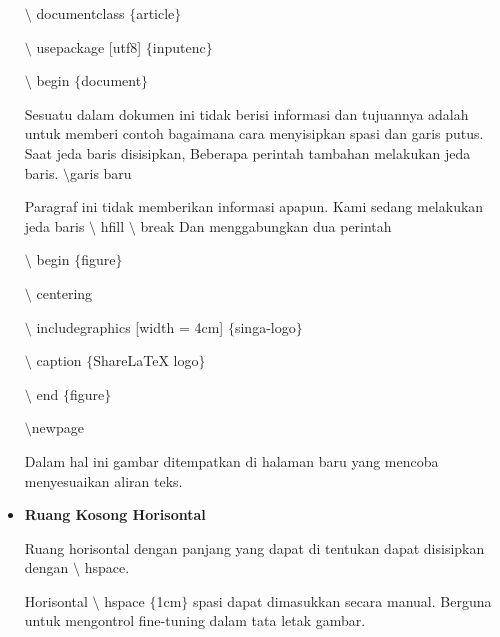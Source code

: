 \begin{itemize}
\hspace*{0.5in}$\setminus$ documentclass $ \{ $article$ \} $\par

\hspace*{0.5in}$\setminus$ usepackage [utf8] $ \{ $inputenc$ \} $ \par

\hspace*{0.5in}$\setminus$ begin $ \{ $document$ \} $\par
\vspace{\baselineskip}
Sesuatu dalam dokumen ini tidak berisi informasi dan tujuannya adalah untuk memberi contoh bagaimana cara menyisipkan spasi dan garis putus. Saat jeda baris disisipkan, Beberapa perintah tambahan melakukan jeda baris. $\setminus$garis baru\par
\vspace{\baselineskip}
Paragraf ini tidak memberikan informasi apapun. Kami sedang melakukan jeda baris $\setminus$ hfill $\setminus$ break Dan menggabungkan dua perintah\par
\vspace{\baselineskip}
\hspace*{0.5in}$\setminus$ begin $ \{ $figure$ \} $\par
\vspace{\baselineskip}
\hspace*{0.5in}$\setminus$ centering\par
\vspace{\baselineskip}
\hspace*{0.5in}$\setminus$ includegraphics [width = 4cm] $ \{ $singa-logo$ \} $\par
\vspace{\baselineskip}
\hspace*{0.5in}$\setminus$ caption $ \{ $ShareLaTeX logo$ \} $\par
\vspace{\baselineskip}
\hspace*{0.5in}$\setminus$ end $ \{ $figure$ \} $ \par
\vspace{\baselineskip}
\hspace*{0.5in}$\setminus$newpage\par
\vspace{\baselineskip}
Dalam hal ini gambar ditempatkan di halaman baru yang mencoba menyesuaikan aliran teks.\par
\vspace{\baselineskip}
\vspace{10pt}
	\item {\fontsize{14pt}{14pt}\selectfont \textbf{Ruang Kosong Horisontal}}\par
\vspace{\baselineskip}
Ruang horisontal dengan panjang yang dapat di tentukan dapat disisipkan dengan $\setminus$ hspace.\par
\vspace{\baselineskip}
Horisontal $\setminus$ hspace $ \{ $1cm$ \} $ spasi dapat dimasukkan secara manual. Berguna untuk mengontrol fine-tuning dalam tata letak gambar.\par


\end{itemize}
